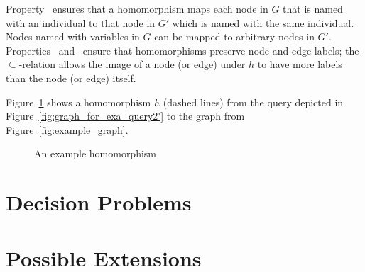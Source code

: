 %
Property~ ensures that a homomorphism maps each node in $G$ that is named with an individual
to that node in $G'$ which is named with the same individual.
Nodes named with variables in $G$ can be mapped to arbitrary nodes in $G'$.
Properties~ and~ ensure that homomorphisms preserve node and edge labels;
the $\subseteq$-relation allows the image of a node (or edge) under $h$ to have more labels
than the node (or edge) itself.

Figure~\ref{fig:example_hmph} shows a homomorphism $h$ (dashed lines)
from the query depicted in Figure~\ref{fig:graph_for_exa_query2'}
to the graph from Figure~\ref{fig:example_graph}.

\begin{figure}[ht]
  \centering
  
  \caption{An example homomorphism}
  \label{fig:example_hmph}
\end{figure}

\section{Decision Problems}
\label{sec:decision_problems}


\section{Possible Extensions}
\label{sec:possible_extensions}

